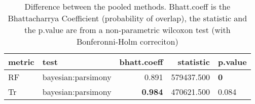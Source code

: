 \begin{table}[ht]
\centering
\begin{tabular}{llr|rl}
  \hline
metric & test & bhatt.coeff & statistic & p.value \\ 
  \hline
RF & bayesian:parsimony & 0.891 & 579437.500 & \textbf{0} \\ 
  Tr & bayesian:parsimony & \textbf{0.984} & 470621.500 & 0.084 \\ 
   \hline
\end{tabular}
\caption{Difference between the pooled methods. Bhatt.coeff is the Bhattacharrya Coefficient (probability of overlap), the statistic and the p.value are from a non-parametric wilcoxon test (with Bonferonni-Holm correciton)} 
\label{Tab_pooledsmethods_test}
\end{table}

